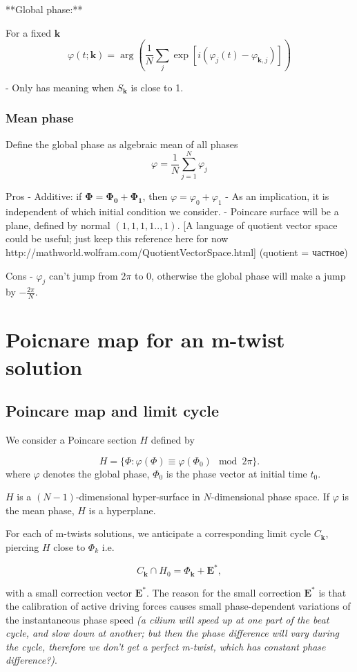 \documentclass[a4paper,12pt]{article}
\begin{document}
**Global phase:**

For a fixed $\mathbf{k}$
$$\varphi(t; \mathbf{k}) = \arg \left( \frac{1}{N}\sum_j \exp\left[ i ( \varphi_j(t) - \varphi_{\mathbf{k},j} ) \right] \right) $$

- Only has meaning when $S_\mathbf{k}$ is close to 1.

\subsubsection{Mean phase}

Define the global phase as algebraic mean of all phases
$$
\varphi =  \frac{1}{N}\sum_{j=1}^{N} \varphi_j
$$

Pros
- Additive: if $\mathbf{\Phi} = \mathbf{\Phi_0}+ \mathbf{\Phi_1} $, then $\varphi = \varphi_0 + \varphi_1$
- As an implication, it is independent of which initial condition we consider.
- Poincare surface will be a plane, defined by normal $(1,1,1,1..,1)$.
  [A language of quotient vector space could be useful; just keep this reference here for now http://mathworld.wolfram.com/QuotientVectorSpace.html]
  (quotient = частное)

Cons
- $\varphi_j$ can't jump from  $2 \pi$ to $0$, otherwise the global phase will make a jump by $- \frac{2 \pi}{N}$.

\section{Poicnare map for an m-twist solution}
\subsection{Poincare map and limit cycle}
We consider a Poincare section $H$ defined by

$$
H =\{ \Phi : \varphi(\Phi) \equiv \varphi(\Phi_0) \mod 2\pi \}.
$$
where $\varphi$ denotes the global phase, $\Phi_0$ is the phase vector at initial time $t_0$. 

 $H$ is a $(N-1)$-dimensional hyper-surface in $N$-dimensional phase space. If $\varphi$ is the mean phase, $H$ is a hyperplane.

For each of m-twists solutions, we anticipate a corresponding limit cycle $C_\mathbf{k}$, piercing $H$ close to $\Phi_k$ i.e.

$$
C_\mathbf{k} \cap H_0 = \Phi_\mathbf{k} + \mathbf{E}^*,
$$

with a small correction vector $\mathbf{E}^*$.
The reason for the small correction $\mathbf{E}^*$ is that the calibration of active driving forces causes small phase-dependent variations of the instantaneous phase speed \textit{(a cilium will speed up at one part of the beat cycle, and slow down at another; but then the phase difference will vary during the cycle, therefore we don't get a perfect m-twist, which has constant phase difference?)}.
\end{document}
